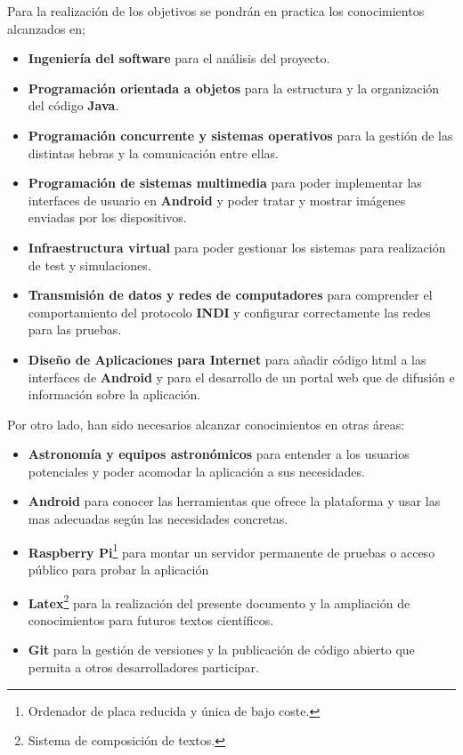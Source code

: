 \bigskip
Para la realización de los objetivos se pondrán en practica los conocimientos alcanzados en;

\begin{itemize}
  \item \textbf{Ingeniería del software} para el análisis del proyecto.
  \item \textbf{Programación orientada a objetos} para la estructura y la organización del código \textbf{Java}.
  \item \textbf{Programación concurrente y sistemas operativos} para la gestión de las distintas hebras y la comunicación entre ellas.
  \item \textbf{Programación de sistemas multimedia} para poder implementar las interfaces de usuario en \textbf{Android} y poder tratar y mostrar imágenes enviadas por los dispositivos.
  \item \textbf{Infraestructura virtual} para poder gestionar los sistemas para realización de test y simulaciones.
  \item \textbf{Transmisión de datos y redes de computadores} para comprender el comportamiento del protocolo \textbf{INDI} y configurar correctamente las redes para las pruebas.
  \item \textbf{Diseño de Aplicaciones para Internet} para añadir código html a las interfaces de \textbf{Android} y para el desarrollo de un portal web que de difusión e información sobre la aplicación.
\end{itemize}

\bigskip
Por otro lado, han sido necesarios alcanzar conocimientos en otras áreas:

\begin{itemize}
  \item \textbf{Astronomía y equipos astronómicos} para entender a los usuarios potenciales y poder acomodar la aplicación a sus necesidades.
  \item \textbf{Android} para conocer las herramientas que ofrece la plataforma y usar las mas adecuadas según las necesidades concretas.
  \item \textbf{Raspberry Pi}\footnote{Ordenador de placa reducida y única de bajo coste.} para montar un servidor permanente de pruebas o acceso público para probar la aplicación
  \item \textbf{Latex}\footnote{Sistema de composición de textos.} para la realización del presente documento y la ampliación de conocimientos para futuros textos científicos.
  \item \textbf{Git} para la gestión de versiones y la publicación de código abierto que permita a otros desarrolladores participar.
\end{itemize}


